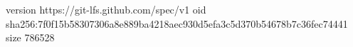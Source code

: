 version https://git-lfs.github.com/spec/v1
oid sha256:7f0f15b58307306a8e889ba4218aec930d5efa3c5d370b54678b7c36fec74441
size 786528
